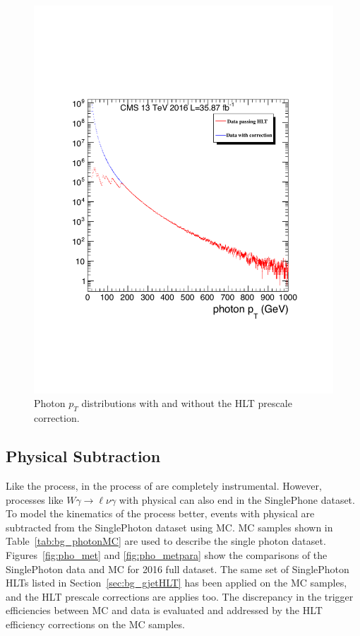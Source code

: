 \begin{figure}[htbp]
\begin{center}
\includegraphics[width=0.86\linewidth]{figures/bg_photonHLT_reweight.pdf}
\caption{Photon $p_T$ distributions with and without the HLT prescale correction. }
\label{fig:photon_pt_prescale}
\end{center}
\end{figure}

\subsection{Physical \boldmath{\ptmiss} Subtraction}\label{sec:bg_gjetphysmet}
Like the \Zjets process,  \ptmiss in the process of \gjets are completely instrumental. However, processes like $W\gamma\rightarrow\ell\nu\gamma$ with physical \ptmiss can also end in the SinglePhone dataset. To model the kinematics of the \gjets process better, events with physical \ptmiss are subtracted from the SinglePhoton dataset using MC. MC samples shown in Table~\ref{tab:bg_photonMC} are used to describe the single photon dataset. Figures~\ref{fig:pho_met} and \ref{fig:pho_metpara} show the comparisons of the SinglePhoton data and MC for 2016 full dataset. The same set of SinglePhoton HLTs listed in Section~\ref{sec:bg_gjetHLT} has been applied on the MC samples, and the HLT prescale corrections are applies too. The discrepancy in the trigger efficiencies between MC and data is evaluated and addressed by the HLT efficiency corrections on the MC samples.


